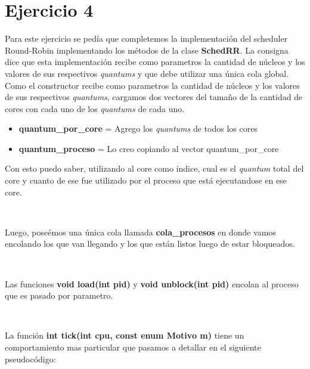 \section{Ejercicio 4}

Para este ejercicio se pedía que completemos la implementación del scheduler Round-Robin implementando los métodos de la clase \textbf{SchedRR}. La consigna dice que esta implementación recibe como parametros la cantidad de núcleos y los valores de sus respectivos \textit{quantums} y que debe utilizar una única cola global.
~
Como el constructor recibe como parametros la cantidad de núcleos y los valores de sus respectivos \textit{quantums}, cargamos dos vectores del tamaño de la cantidad de cores con cada uno de los \textit{quantums} de cada uno.

\begin{itemize}
	\item \textbf{quantum\_por\_core} = Agrego los \textit{quantums} de todos los cores
	\item \textbf{quantum\_proceso} = Lo creo copiando al vector quantum\_por\_core
\end{itemize}

Con esto puedo saber, utilizando al core como índice, cual es el \textit{quantum} total del core y cuanto de ese fue utilizado por el proceso que está ejecutandose en ese core.

~

Luego, poseémos una única cola llamada \textbf{cola\_procesos} en donde vamos encolando los que van llegando y los que están listos luego de estar bloqueados.

~

Las funciones \textbf{void load(int pid)} y \textbf{void unblock(int pid)} encolan al proceso que es pasado por parametro.

~

La función \textbf{int tick(int cpu, const enum Motivo m)} tiene un comportamiento mas particular que pasamos a detallar en el siguiente pseudocódigo:

~

